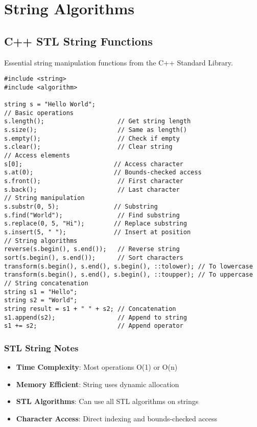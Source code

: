 \documentclass[11pt,a4paper]{article}
\begin{document}
\newpage

\section{String Algorithms}

\subsection{C++ STL String Functions}
Essential string manipulation functions from the C++ Standard Library.

\begin{lstlisting}[caption={STL String Functions}]
#include <string>
#include <algorithm>

string s = "Hello World";
// Basic operations
s.length();                    // Get string length
s.size();                      // Same as length()
s.empty();                     // Check if empty
s.clear();                     // Clear string
// Access elements
s[0];                         // Access character
s.at(0);                      // Bounds-checked access
s.front();                     // First character
s.back();                      // Last character
// String manipulation
s.substr(0, 5);               // Substring
s.find("World");               // Find substring
s.replace(0, 5, "Hi");        // Replace substring
s.insert(5, " ");             // Insert at position
// String algorithms
reverse(s.begin(), s.end());   // Reverse string
sort(s.begin(), s.end());      // Sort characters
transform(s.begin(), s.end(), s.begin(), ::tolower); // To lowercase
transform(s.begin(), s.end(), s.begin(), ::toupper); // To uppercase
// String concatenation
string s1 = "Hello";
string s2 = "World";
string result = s1 + " " + s2; // Concatenation
s1.append(s2);                 // Append to string
s1 += s2;                      // Append operator
\end{lstlisting}

\subsubsection{STL String Notes}
\begin{itemize}
\item \textbf{Time Complexity}: Most operations O(1) or O(n)
\item \textbf{Memory Efficient}: String uses dynamic allocation
\item \textbf{STL Algorithms}: Can use all STL algorithms on strings
\item \textbf{Character Access}: Direct indexing and bounds-checked access
\end{itemize}
\end{document}
